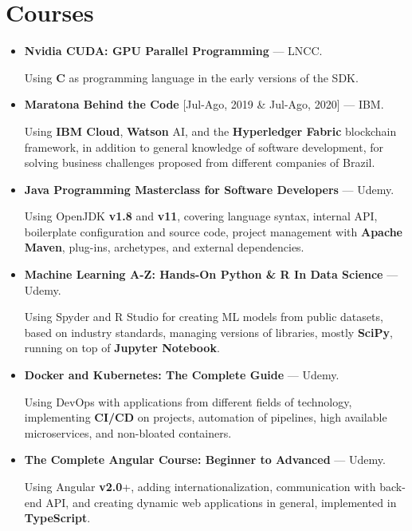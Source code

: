 \section{Courses}

\begin{itemize}
  \item \textbf{Nvidia CUDA: GPU Parallel Programming} --- LNCC.

    Using \textbf{C} as programming language in the early versions of the SDK.

  \item \textbf{Maratona Behind the Code} {[Jul-Ago, 2019 \& Jul-Ago, 2020]} --- IBM.

    Using \textbf{IBM Cloud}, \textbf{Watson} AI, and the
    \textbf{Hyperledger Fabric} blockchain framework, in addition to
    general knowledge of software development, for solving business
    challenges proposed from different companies of Brazil.

  \item \textbf{Java Programming Masterclass for Software Developers} --- Udemy.

    Using OpenJDK \textbf{v1.8} and \textbf{v11}, covering language syntax,
    internal API, boilerplate configuration and source code, project management
    with \textbf{Apache Maven}, plug-ins, archetypes, and external dependencies.

  \item \textbf{Machine Learning A-Z\texttrademark: Hands-On Python \& R In Data
    Science} --- Udemy.

    Using Spyder and R Studio for creating ML models from public datasets,
    based on industry standards, managing versions of libraries, mostly
  \textbf{SciPy}, running on top of \textbf{Jupyter Notebook}.

  \item \textbf{Docker and Kubernetes: The Complete Guide} --- Udemy.

    Using DevOps with applications from different fields of technology,
    implementing \textbf{CI/CD} on projects, automation of pipelines, high
    available microservices, and non-bloated containers.

  \item \textbf{The Complete Angular Course: Beginner to Advanced} --- Udemy.

  Using Angular \textbf{v2.0}+, adding internationalization, communication
    with back-end API, and creating dynamic web applications in general,
    implemented in \textbf{TypeScript}.

\end{itemize}
